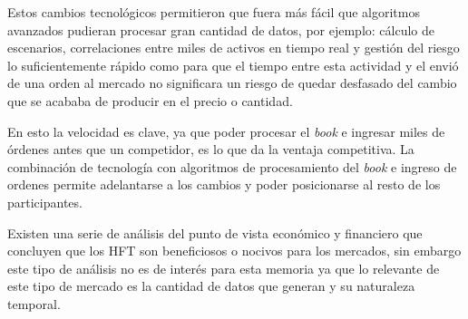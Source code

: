 Estos cambios tecnológicos permitieron que fuera más fácil que algoritmos
avanzados pudieran procesar gran cantidad de datos, por ejemplo: cálculo de
escenarios, correlaciones entre miles de activos en tiempo real y gestión del
riesgo lo suficientemente rápido como para que el tiempo entre esta actividad y
el envió de una orden al mercado no significara un riesgo de quedar desfasado
del cambio que se acababa de producir en el precio o cantidad.


En esto la velocidad es clave, ya que poder procesar el \emph{book} e ingresar
miles de órdenes antes que un competidor, es lo que da la ventaja competitiva.
La combinación de tecnología con algoritmos de procesamiento del \emph{book} e
ingreso de ordenes permite adelantarse a los cambios y poder posicionarse al
resto de los participantes. 
 
Existen una serie de análisis del punto de vista económico y financiero que
concluyen que los HFT son beneficiosos o nocivos para los mercados, sin embargo
este tipo de análisis no es de interés para esta memoria ya que lo relevante de
este tipo de mercado es la cantidad de datos que generan y su naturaleza
temporal.
